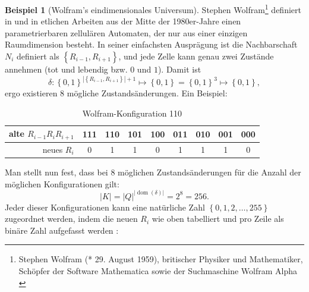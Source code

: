 \documentclass[11pt]{report} %
\theoremstyle{definition}
\newtheorem*{beisp}{Beispiel}
\begin{document}
\begin{beisp}[Wolfram's eindimensionales Universum] Stephen Wolfram\footnote{Stephen Wolfram (* 29. August 1959), britischer Physiker und Mathematiker, Schöpfer der Software Mathematica sowie der Suchmaschine Wolfram Alpha \cite{wiki:wolfram}} definiert in \cite{wolfram2002} und in etlichen Arbeiten aus der Mitte der 1980er-Jahre einen parametrierbaren zellulären Automaten, der nur aus einer einzigen Raumdimension besteht\cite{wiki:wolfram}. In seiner einfachsten Ausprägung ist die Nachbarschaft $N_i$ definiert als $\left\{ R_{i-1}, R_{i+1} \right\}$, und jede Zelle kann genau zwei Zustände annehmen (tot und lebendig bzw. $0$ und $1$). Damit ist
\begin{equation*}
\delta : \left\{0,1\right\}^{|\left\{ R_{i-1}, R_{i+1}\right\}|+ 1} \mapsto \left\{0,1\right\} = \left\{0,1\right\}^3 \mapsto \left\{0,1\right\},
\end{equation*}
ergo existieren 8 mögliche Zustandsänderungen. Ein Beispiel:

\begin{table}[here]
\begin{center}
\begin{tabular}{|r||c|c|c|c|c|c|c|c|}
\hline
alte $R_{i-1}R_iR_{i+1}$ &111& 110 & 101 &100 &011 &010 &001 &000  \\\hline
neues $R_i$ & 0 & 1 & 1 & 0& 1 & 1 & 1 & 0 \\\hline
\end{tabular}
\end{center}
\caption{Wolfram-Konfiguration 110}
\label{wolfram110}
\end{table}

Man stellt nun fest, dass bei 8 möglichen Zustandsänderungen für die Anzahl der möglichen Konfigurationen gilt:
\begin{equation*}
|K| = |Q|^{|\operatorname{dom}(\delta)|} = 2^8 = 256.
\end{equation*}
Jeder dieser Konfigurationen kann eine natürliche Zahl $\left\{0, 1, 2, \dots, 255\right\}$ zugeordnet werden, indem die neuen $R_i$ wie oben tabelliert und pro Zeile als binäre Zahl aufgefasst werden \cite{betz2003}:


\end{beisp}
\end{document}
